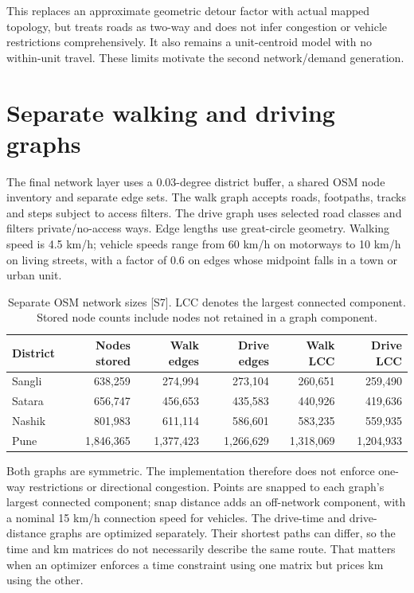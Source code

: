 \documentclass[11pt,a4paper,oneside]{report}
\newcommand{\source}[1]{\par\nopagebreak[4]{\footnotesize\color{teal}Evidence: #1.}\par}
\begin{document}
This replaces an approximate geometric detour factor with actual mapped topology, but treats roads as two-way and does not infer congestion or vehicle restrictions comprehensively. It also remains a unit-centroid model with no within-unit travel. These limits motivate the second network/demand generation.
\source{[S3], [S7]}

\section{Separate walking and driving graphs}
The final network layer uses a 0.03-degree district buffer, a shared OSM node inventory and separate edge sets. The walk graph accepts roads, footpaths, tracks and steps subject to access filters. The drive graph uses selected road classes and filters private/no-access ways. Edge lengths use great-circle geometry. Walking speed is 4.5 km/h; vehicle speeds range from 60 km/h on motorways to 10 km/h on living streets, with a factor of 0.6 on edges whose midpoint falls in a town or urban unit.
\begin{table}[htbp]\centering
\small
\setlength{\tabcolsep}{5pt}
\caption{Separate OSM network sizes [S7]. LCC denotes the largest connected component. Stored node counts include nodes not retained in a graph component.}
\begin{tabular}{lrrrrr}
\toprule
District & Nodes stored & Walk edges & Drive edges & Walk LCC & Drive LCC\\
\midrule
Sangli & 638,259 & 274,994 & 273,104 & 260,651 & 259,490\\
Satara & 656,747 & 456,653 & 435,583 & 440,926 & 419,636\\
Nashik & 801,983 & 611,114 & 586,601 & 583,235 & 559,935\\
Pune & 1,846,365 & 1,377,423 & 1,266,629 & 1,318,069 & 1,204,933\\
\bottomrule\end{tabular}
\end{table}
Both graphs are symmetric. The implementation therefore does not enforce one-way restrictions or directional congestion. Points are snapped to each graph's largest connected component; snap distance adds an off-network component, with a nominal 15 km/h connection speed for vehicles. The drive-time and drive-distance graphs are optimized separately. Their shortest paths can differ, so the time and km matrices do not necessarily describe the same route. That matters when an optimizer enforces a time constraint using one matrix but prices km using the other.
\end{document}

